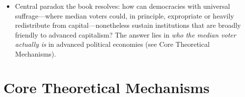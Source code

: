 \documentclass[12pt]{article}
\begin{document}
\begin{itemize}[leftmargin=*, itemsep=4pt]
    \item Central paradox the book resolves: how can democracies with universal suffrage---where median voters could, in principle, expropriate or heavily redistribute from capital---nonetheless sustain institutions that are broadly friendly to advanced capitalism? The answer lies in \textit{who the median voter actually is} in advanced political economies (see Core Theoretical Mechanisms).
\end{itemize}

\section{Core Theoretical Mechanisms}
\end{document}
